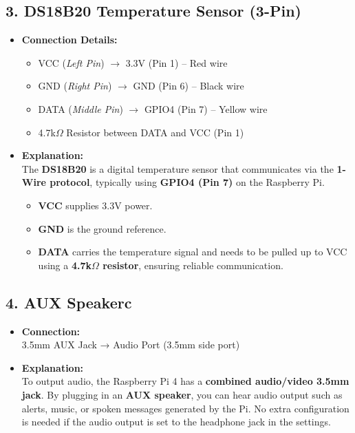 \subsection*{3. DS18B20 Temperature Sensor (3-Pin)}

\begin{itemize}
    \item \textbf{Connection Details:}
    \begin{itemize}
        \item VCC (\textit{Left Pin}) $\rightarrow$ 3.3V (Pin 1) – Red wire
        \item GND (\textit{Right Pin}) $\rightarrow$ GND (Pin 6) – Black wire
        \item DATA (\textit{Middle Pin}) $\rightarrow$ GPIO4 (Pin 7) – Yellow wire
        \item 4.7k$\Omega$ Resistor between DATA and VCC (Pin 1)
    \end{itemize}

    \item \textbf{Explanation:} \\
    The \textbf{DS18B20} is a digital temperature sensor that communicates via the \textbf{1-Wire protocol}, typically using \textbf{GPIO4 (Pin 7)} on the Raspberry Pi.
    
    \begin{itemize}
        \item \textbf{VCC} supplies 3.3V power.
        \item \textbf{GND} is the ground reference.
        \item \textbf{DATA} carries the temperature signal and needs to be pulled up to VCC using a \textbf{4.7k$\Omega$ resistor}, ensuring reliable communication.
    \end{itemize}
\end{itemize}

\subsection*{4. AUX Speakerc}
\begin{itemize}
 \item \textbf{Connection:} \\
  3.5mm AUX Jack → Audio Port (3.5mm side port)

  \item \textbf{Explanation:} \\
To output audio, the Raspberry Pi 4 has a \textbf{combined audio/video 3.5mm jack}. By plugging in an \textbf{AUX speaker}, you can hear audio output such as alerts, music, or spoken messages generated by the Pi. No extra configuration is needed if the audio output is set to the headphone jack in the settings.
 
 \end{itemize}

